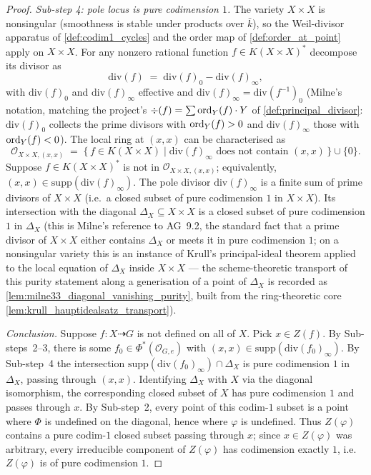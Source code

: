 \begin{proof}
  \emph{Sub-step 4: pole locus is pure codimension \(1\).} The variety \(X \times X\) is
  nonsingular (smoothness is stable under products over \(\bar k\)), so the Weil-divisor
  apparatus of \cref{def:codim1_cycles} and the order map of
  \cref{def:order_at_point} apply on \(X \times X\). For any nonzero rational function
  \(f \in K(X \times X)^\ast\) decompose its divisor as
  \[
    \mathrm{div}(f) \;=\; \mathrm{div}(f)_0 - \mathrm{div}(f)_\infty,
  \]
  with \(\mathrm{div}(f)_0\) and \(\mathrm{div}(f)_\infty\) effective and
  \(\mathrm{div}(f)_\infty = \mathrm{div}(f^{-1})_0\) (Milne's notation, matching the
  project's \(\div(f) = \sum \operatorname{ord}_Y(f) \cdot Y\) of
  \cref{def:principal_divisor}: \(\mathrm{div}(f)_0\) collects the prime divisors with
  \(\operatorname{ord}_Y(f) > 0\) and \(\mathrm{div}(f)_\infty\) those with \(\operatorname{ord}_Y(f) < 0\)). The local
  ring at \((x, x)\) can be characterised as
  \[
    \mathcal O_{X \times X, (x, x)}
    \;=\; \bigl\{\, f \in K(X \times X) \;\big|\;
    \mathrm{div}(f)_\infty \text{ does not contain } (x, x) \,\bigr\} \cup \{0\}.
  \]
  Suppose \(f \in K(X \times X)^\ast\) is not in \(\mathcal O_{X \times X, (x, x)}\);
  equivalently, \((x, x) \in \mathrm{supp}(\mathrm{div}(f)_\infty)\). The pole divisor
  \(\mathrm{div}(f)_\infty\) is a finite sum of prime divisors of \(X \times X\) (i.e.\ a
  closed subset of pure codimension \(1\) in \(X \times X\)). Its intersection with the
  diagonal \(\Delta_X \subseteq X \times X\) is a closed subset of pure codimension \(1\)
  in \(\Delta_X\) (this is Milne's reference to AG~9.2, the standard fact that a prime
  divisor of \(X \times X\) either contains \(\Delta_X\) or meets it in pure codimension
  \(1\); on a nonsingular variety this is an instance of Krull's principal-ideal theorem
  applied to the local equation of \(\Delta_X\) inside \(X \times X\) --- the
  scheme-theoretic transport of this purity statement along a generisation of a
  point of \(\Delta_X\) is recorded as \cref{lem:milne33_diagonal_vanishing_purity},
  built from the ring-theoretic core \cref{lem:krull_hauptidealsatz_transport}).

  \emph{Conclusion.} Suppose \(f \colon X \dashrightarrow G\) is not defined on all of
  \(X\). Pick \(x \in Z(f)\). By Sub-steps~2--3, there is some \(f_0 \in
  \Phi^\ast(\mathcal O_{G, e})\) with \((x, x) \in \mathrm{supp}(\mathrm{div}(f_0)_\infty)\).
  By Sub-step~4 the intersection \(\mathrm{supp}(\mathrm{div}(f_0)_\infty) \cap
  \Delta_X\) is pure codimension \(1\) in \(\Delta_X\), passing through \((x, x)\).
  Identifying \(\Delta_X\) with \(X\) via the diagonal isomorphism, the corresponding
  closed subset of \(X\) has pure codimension \(1\) and passes through \(x\). By Sub-step~2,
  every point of this codim-\(1\) subset is a point where \(\Phi\) is undefined on the
  diagonal, hence where \(\varphi\) is undefined. Thus \(Z(\varphi)\) contains a pure
  codim-\(1\) closed subset passing through \(x\); since \(x \in Z(\varphi)\) was arbitrary,
  every irreducible component of \(Z(\varphi)\) has codimension exactly \(1\), i.e.\
  \(Z(\varphi)\) is of pure codimension \(1\).
\end{proof}

